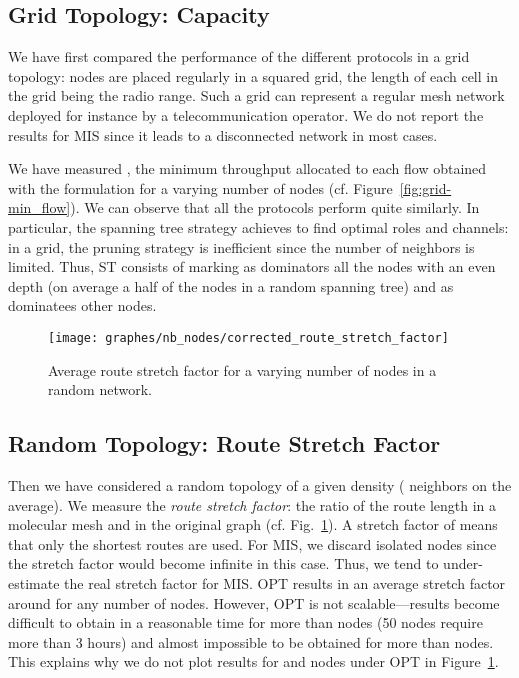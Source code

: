 \documentclass[twoside]{article}
\begin{document}
\subsection{Grid Topology: Capacity}

We have first compared the performance of the different protocols in a
grid topology: nodes are placed regularly in a squared grid, the
length of each cell in the grid being the radio range. Such a grid can
represent a regular mesh network deployed for instance by a
telecommunication operator. We do not report the results for MIS since
it leads to a disconnected network in most cases.

We have measured , the minimum throughput allocated to
each flow obtained with the \milp formulation for a varying number of
nodes (cf. Figure~\ref{fig:grid-min_flow}). We can observe that all
the protocols perform quite similarly. In particular, the spanning
tree strategy achieves to find optimal roles and channels: in a grid,
the pruning strategy is inefficient since the number of neighbors
is limited. Thus, ST consists of marking as dominators all the nodes
with an even depth (on average a half of the nodes in a random
spanning tree) and as dominatees other nodes.


\begin{figure}[!h]
\centering
	\texttt{[image: graphes/nb\_nodes/corrected\_route\_stretch\_factor]}        
	\caption{Average route stretch factor for a varying number of
          nodes in a random network.}
\label{fig:nb_nodes-route_stretch_factor}
\end{figure}

\subsection{Random Topology: Route Stretch Factor}

Then we have considered a random topology of a given density ( neighbors
on the average). We measure the {\em route stretch factor}: the ratio
of the route length in a molecular mesh and in the original graph
(cf. Fig.~\ref{fig:nb_nodes-route_stretch_factor}). A stretch factor
of  means that only the shortest routes are used. For MIS, we
discard isolated nodes since the stretch factor would become infinite
in this case. Thus, we tend to under-estimate the real stretch factor
for MIS.  OPT results in an average stretch
factor around  for any number of nodes. However, OPT is not
scalable---results become difficult to obtain in a reasonable time for
more than  nodes (50 nodes require more than 3 hours) and almost
impossible to be obtained for more than  nodes. This explains why
we do not plot results for  and  nodes under OPT in
Figure~\ref{fig:nb_nodes-route_stretch_factor}.
\end{document}
